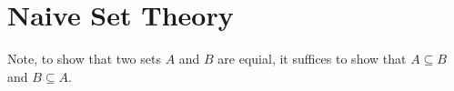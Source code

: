 \guard
\section{Naive Set Theory}
\label{sec:naiveSetTheory}








Note, to show that two sets $A$ and $B$ are equial, it suffices to show that $A\subseteq B$ and $B\subseteq A$.



